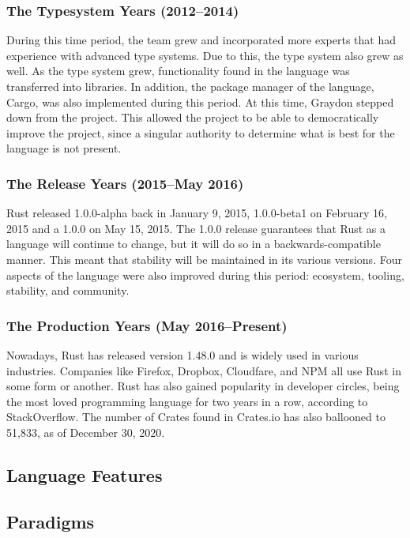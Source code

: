 \documentclass{article}
\begin{document}
  \subsubsection{The Typesystem Years (2012--2014)}
  During this time period, the team grew and incorporated more experts that had
  experience with advanced type systems. Due to this, the type system also grew
  as well. As the type system grew, functionality found in the language was
  transferred into libraries. In addition, the package manager of the language,
  Cargo, was also implemented during this period. At this time, Graydon stepped
  down from the project. This allowed the project to be able to democratically
  improve the project, since a singular authority to determine what is best for
  the language is not present.

  \subsubsection{The Release Years (2015--May 2016)}
  Rust released 1.0.0-alpha back in January 9, 2015, 1.0.0-beta1 on February 16,
  2015 and a 1.0.0 on May 15, 2015. The 1.0.0 release guarantees that Rust as a
  language will continue to change, but it will do so in a backwards-compatible
  manner. This meant that stability will be maintained in its various versions.
  Four aspects of the language were also improved during this period: ecosystem,
  tooling, stability, and community.

  \subsubsection{The Production Years (May 2016--Present)}
  Nowadays, Rust has released version 1.48.0 and is widely used in various
  industries. Companies like Firefox, Dropbox, Cloudfare, and NPM all use Rust
  in some form or another. Rust has also gained popularity in developer circles,
  being the most loved programming language for two years in a row, according to
  StackOverflow. The number of Crates found in Crates.io has also ballooned to
  51,833, as of December 30, 2020.

  \subsection{Language Features}
  \subsection{Paradigms}


  \newpage
  \nocite{*}
  \printbibliography[heading=bibintoc,title={References}]{}
\end{document}
